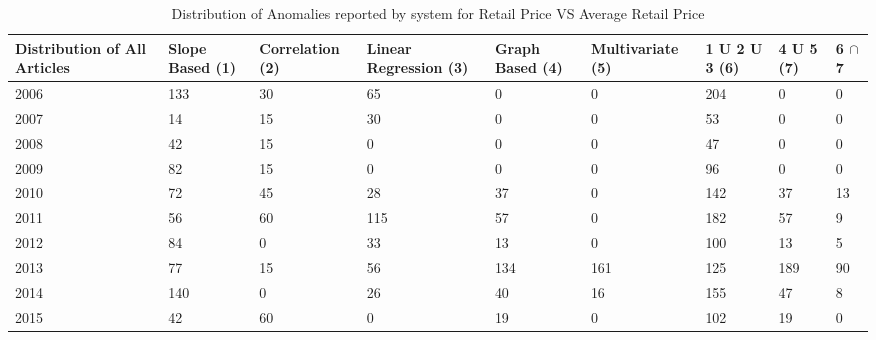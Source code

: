 	
	
	
	\begin{table}[]
	\centering
	\resizebox{\textwidth}{!}
	{\begin{tabular}{|l|l|l|l|l|l|l|l|l|}
	\hline
	Distribution of All Articles & Slope Based (1) & Correlation (2) & Linear Regression (3) & Graph Based (4) & Multivariate (5) & 1 U 2 U 3 (6) & 4 U 5 (7) & 6 $\cap$ 7 \\
	\hline
	2006 & 133 & 30 & 65  & 0   & 0   & 204 & 0   & 0  \\
	\hline
	2007 & 14  & 15 & 30  & 0   & 0   & 53  & 0   & 0  \\
	\hline
	2008 & 42  & 15 & 0   & 0   & 0   & 47  & 0   & 0  \\
	\hline
	2009 & 82  & 15 & 0   & 0   & 0   & 96  & 0   & 0  \\
	\hline
	2010 & 72  & 45 & 28  & 37  & 0   & 142 & 37  & 13 \\
	\hline
	2011 & 56  & 60 & 115 & 57  & 0   & 182 & 57  & 9  \\
	\hline
	2012 & 84  & 0  & 33  & 13  & 0   & 100 & 13  & 5  \\
	\hline
	2013 & 77  & 15 & 56  & 134 & 161 & 125 & 189 & 90 \\
	\hline
	2014 & 140 & 0  & 26  & 40  & 16  & 155 & 47  & 8  \\
	\hline
	2015 & 42  & 60 & 0   & 19  & 0   & 102 & 19  & 0  \\
	\hline
	\end{tabular}}
	\caption{Distribution of Anomalies reported by system for Retail Price VS Average Retail Price}
	\label{RetailVsAverageDist}
	\end{table}
	  
	  
	  
